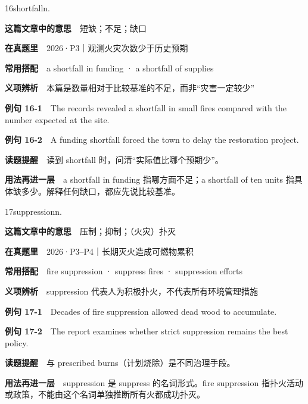 \documentclass[a4paper,11pt,openany]{report}
\newcommand{\emphasislabel}[1]{\textcolor{leaf}{\CJKsf\bfseries #1}}
\begin{document}
\begin{vocabbox}{16}{shortfall}{n.}

\textbf{这篇文章中的意思}　短缺；不足；缺口

\textbf{在真题里}　2026·P3｜观测火灾次数少于历史预期

\textbf{常用搭配}　a shortfall in funding · a shortfall of supplies

\textbf{义项辨析}　本篇是数量相对于比较基准的不足，而非``灾害一定较少''

\textbf{例句 16-1}　The records revealed a shortfall in small fires compared with the number expected at the site.

\textbf{例句 16-2}　A funding shortfall forced the town to delay the restoration project.

\emphasislabel{读题提醒}　读到 shortfall 时，问清``实际值比哪个预期少''。

\textbf{用法再进一层}　a shortfall in funding 指哪方面不足；a shortfall of ten units 指具体缺多少。解释任何缺口，都应先说比较基准。

\end{vocabbox}

\begin{vocabbox}{17}{suppression}{n.}

\textbf{这篇文章中的意思}　压制；抑制；（火灾）扑灭

\textbf{在真题里}　2026·P3--P4｜长期灭火造成可燃物累积

\textbf{常用搭配}　fire suppression · suppress fires · suppression efforts

\textbf{义项辨析}　suppression 代表人为积极扑火，不代表所有环境管理措施

\textbf{例句 17-1}　Decades of fire suppression allowed dead wood to accumulate.

\textbf{例句 17-2}　The report examines whether strict suppression remains the best policy.

\emphasislabel{读题提醒}　与 prescribed burns（计划烧除）是不同治理手段。

\textbf{用法再进一层}　suppression 是 suppress 的名词形式。fire suppression 指扑火活动或政策，不能由这个名词单独推断所有火都成功扑灭。

\end{vocabbox}
\end{document}
